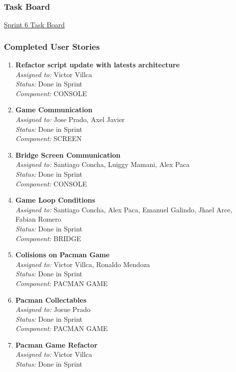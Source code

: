 \subsubsection*{Task Board}
\href{https://tree.taiga.io/project/joseluis-teran-coffeetime/taskboard/sprint-6-3003}{Sprint 6 Task Board}

\subsubsection*{Completed User Stories}

\begin{enumerate}
    \item \textbf{Refactor script update with latests architecture} \\
    \textit{Assigned to:} Victor Villca \\
    \textit{Status:} Done in Sprint \\
    \textit{Component:} CONSOLE
    \item \textbf{Game Communication} \\
    \textit{Assigned to:} Jose Prado, Axel Javier \\
    \textit{Status:} Done in Sprint \\
    \textit{Component:} SCREEN
    \item \textbf{Bridge Screen Communication} \\
    \textit{Assigned to:} Santiago Concha, Luiggy Mamani, Alex Paca \\
    \textit{Status:} Done in Sprint \\
    \textit{Component:} CONSOLE
    \item \textbf{Game Loop Conditions} \\
    \textit{Assigned to:} Santiago Concha, Alex Paca, Emanuel Galindo, Jhael Arce, Fabian Romero \\
    \textit{Status:} Done in Sprint \\
    \textit{Component:} BRIDGE
    \item \textbf{Colisions on Pacman Game} \\
    \textit{Assigned to:} Victor Villca, Ronaldo Mendoza  \\
    \textit{Status:} Done in Sprint \\
    \textit{Component:} PACMAN GAME
    \item \textbf{Pacman Collectables} \\
    \textit{Assigned to:} Josue Prado \\
    \textit{Status:} Done in Sprint \\
    \textit{Component:} PACMAN GAME
    \item \textbf{Pacman Game Refactor } \\
    \textit{Assigned to:} Victor Villca \\
    \textit{Status:} Done in Sprint \\
\end{enumerate}

